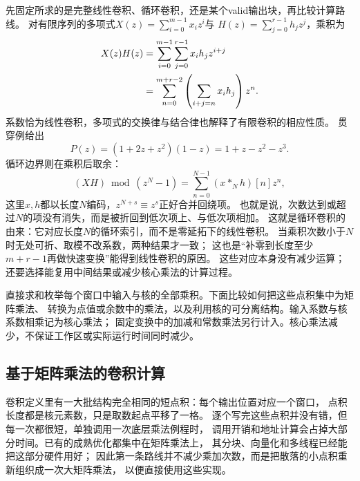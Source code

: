 先固定所求的是完整线性卷积、循环卷积，还是某个valid输出块，再比较计算路线。
对有限序列的多项式$X(z)=\sum_{i=0}^{m-1}x_i z^i$与
$H(z)=\sum_{j=0}^{r-1}h_jz^j$，乘积为
\begin{align}
  X(z)H(z)
  &=\sum_{i=0}^{m-1}\sum_{j=0}^{r-1}x_i h_jz^{i+j}\notag\\
  &=\sum_{n=0}^{m+r-2}\left(\sum_{i+j=n}x_i h_j\right)z^n.
  \label{eq:signal-analysis-polynomial-convolution}
\end{align}
系数恰为线性卷积，多项式的交换律与结合律也解释了有限卷积的相应性质。
贯穿例给出
\begin{equation}
  P(z)=(1+2z+z^2)(1-z)=1+z-z^2-z^3.
  \label{eq:signal-analysis-running-polynomial-product}
\end{equation}
循环边界则在乘积后取余：
\begin{equation}
  (XH)\bmod(z^N-1)=\sum_{n=0}^{N-1}(x*_Nh)[n]z^n,
  \label{eq:signal-analysis-polynomial-circular-convolution}
\end{equation}
这里$x,h$都以长度$N$编码，$z^{N+s}\equiv z^s$正好合并回绕项。
也就是说，次数达到或超过$N$的项没有消失，而是被折回到低次项上、与低次项相加。
这就是循环卷积的由来：它对应长度$N$的循环索引，而不是零延拓下的线性卷积。
当乘积次数小于$N$时无处可折、取模不改系数，两种结果才一致；
这也是“补零到长度至少$m+r-1$再做快速变换”能得到线性卷积的原因。
这些对应本身没有减少运算；还要选择能复用中间结果或减少核心乘法的计算过程。

直接求和枚举每个窗口中输入与核的全部乘积。下面比较如何把这些点积集中为矩阵乘法、
转换为点值或余数中的乘法，以及利用核的可分离结构。输入系数与核系数相乘记为核心乘法；
固定变换中的加减和常数乘法另行计入。核心乘法减少，不保证工作区或实际运行时间同时减少。

\subsection{基于矩阵乘法的卷积计算}\label{sec:signal-analysis-fast-matrix}
\label{sec:cnn-matrix-algorithm}

卷积定义里有一大批结构完全相同的短点积：每个输出位置对应一个窗口，
点积长度都是核元素数，只是取数起点平移了一格。
逐个写完这些点积并没有错，但每一次都很短，单独调用一次底层乘法例程时，
调用开销和地址计算会占掉大部分时间。已有的成熟优化都集中在矩阵乘法上，
其分块、向量化和多线程已经能把这部分硬件用好；
因此第一条路线并不减少乘加次数，而是把散落的小点积重新组织成一次大矩阵乘法，
以便直接使用这些实现。

